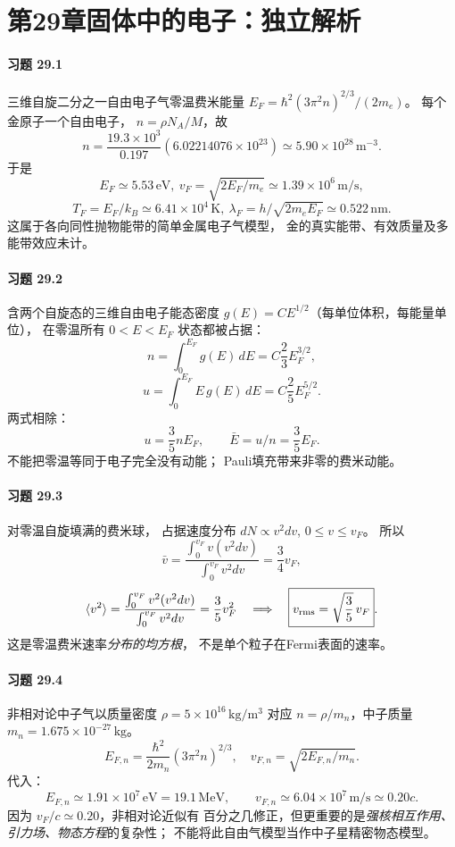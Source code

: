 \section*{第29章\quad 固体中的电子：独立解析}
\paragraph{习题 29.1}
三维自旋二分之一自由电子气零温费米能量
\(E_F=\hbar^2(3\pi^2n)^{2/3}/(2m_e)\)。
每个金原子一个自由电子，
\(n=\rho N_A/M\)，故
\[
n=\frac{19.3\times10^3}{0.197}
(6.02214076\times10^{23})
\simeq5.90\times10^{28}\,\mathrm{m^{-3}}.
\]
于是
\[
\boxed{E_F\simeq5.53\,\mathrm{eV}},\
\boxed{v_F=\sqrt{2E_F/m_e}\simeq1.39\times10^6\,\mathrm{m/s}},
\]
\[
\boxed{T_F=E_F/k_B\simeq6.41\times10^4\,\mathrm K},\
\boxed{\lambda_F=h/\sqrt{2m_eE_F}\simeq0.522\,\mathrm{nm}}.
\]
这属于各向同性抛物能带的简单金属电子气模型，
金的真实能带、有效质量及多能带效应未计。

\paragraph{习题 29.2}
含两个自旋态的三维自由电子能态密度
\(g(E)=C E^{1/2}\)（每单位体积，每能量单位），
在零温所有 \(0<E<E_F\) 状态都被占据：
\[
n=\int_0^{E_F}g(E)\,dE
=C\frac23E_F^{3/2},
\]
\[
u=\int_0^{E_F}E\,g(E)\,dE
=C\frac25E_F^{5/2}.
\]
两式相除：
\[
\boxed{u=\frac35nE_F},\qquad
\boxed{\bar E=u/n=\frac35E_F}.
\]
不能把零温等同于电子完全没有动能；
Pauli填充带来非零的费米动能。

\paragraph{习题 29.3}
对零温自旋填满的费米球，
占据速度分布 \(dN\propto v^2dv\),
\(0\le v\le v_F\)。
所以
\[
\bar v=\frac{\int_0^{v_F}v(v^2dv)}
{\int_0^{v_F}v^2dv}
=\boxed{\frac34v_F},
\]
\[
\langle v^2\rangle=
\frac{\int_0^{v_F}v^2(v^2dv)}
{\int_0^{v_F}v^2dv}
=\frac35v_F^2
\quad\Longrightarrow\quad
\boxed{v_{\rm rms}=\sqrt{\frac35}\,v_F}.
\]
这是零温费米速率\emph{分布的均方根}，
不是单个粒子在Fermi表面的速率。

\paragraph{习题 29.4}
非相对论中子气以质量密度
\(\rho=5\times10^{16}\,\mathrm{kg/m^3}\) 对应
\(n=\rho/m_n\)，中子质量
\(m_n=1.675\times10^{-27}\,\mathrm{kg}\)。
\[
E_{F,n}=\frac{\hbar^2}{2m_n}(3\pi^2n)^{2/3},
\quad
v_{F,n}=\sqrt{2E_{F,n}/m_n}.
\]
代入：
\[
\boxed{E_{F,n}\simeq1.91\times10^7\,\mathrm{eV}
=19.1\,\mathrm{MeV}},\qquad
\boxed{v_{F,n}\simeq6.04\times10^7\,\mathrm{m/s}
\simeq0.20c}.
\]
因为 \(v_F/c\simeq0.20\)，非相对论近似有
百分之几修正，但更重要的是\emph{强核相互作用、
引力场、物态方程}的复杂性；
不能将此自由气模型当作中子星精密物态模型。


